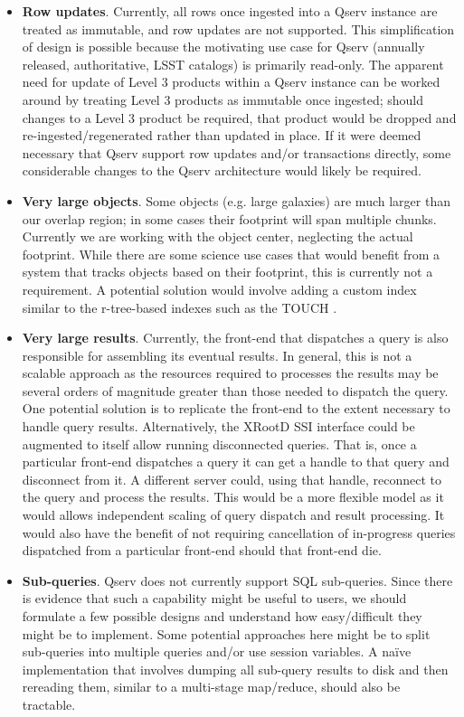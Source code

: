 \documentclass[DM,lsstdraft,toc]{lsstdoc}
\begin{document}
\begin{itemize}
\item
  \textbf{Row updates}. Currently, all rows once ingested into a Qserv
  instance are treated as immutable, and row updates are not supported. This
  simplification of design is possible because the motivating use case for
  Qserv (annually released, authoritative, LSST catalogs) is primarily
  read-only.  The apparent need for update of Level 3 products within a Qserv
  instance can be worked around by treating Level 3 products as immutable once
  ingested; should changes to a Level 3 product be required, that product
  would be dropped and re-ingested/regenerated rather than updated in place.
  If it were deemed necessary that Qserv support row updates and/or
  transactions directly, some considerable changes to the Qserv architecture
  would likely be required.
\item
  \textbf{Very large objects}. Some objects (e.g. large galaxies) are
  much larger than our overlap region; in some cases their footprint
  will span multiple chunks. Currently we are working with the object
  center, neglecting the actual footprint. While there are some science
  use cases that would benefit from a system that tracks objects based
  on their footprint, this is currently not a requirement. A potential
  solution would involve adding a custom index similar to the
  r-tree-based indexes such as the TOUCH
  \citep{Nobari:2013:TIS:2463676.2463700}.
\item
  \textbf{Very large results}. Currently, the front-end that dispatches
  a query is also responsible for assembling its eventual results. In general,
  this is not a scalable approach as the resources required to processes the
  results may be several orders of magnitude greater than those needed
  to dispatch the query.  One potential solution is to replicate the
  front-end to the extent necessary to handle query results. Alternatively,
  the XRootD SSI interface could be augmented to itself allow running
  disconnected queries. That is, once a particular front-end dispatches
  a query it can get a handle to that query and disconnect from it.
  A different server could, using that handle, reconnect to the query and
  process the results. This would be a more flexible model as it would allows
  independent scaling of query dispatch and result processing. It would also
  have the benefit of not requiring cancellation of in-progress queries
  dispatched from a particular front-end should that front-end die.
\item
  \textbf{Sub-queries}. Qserv does not currently support SQL sub-queries.
  Since there is evidence that such a capability might be useful to users, we
  should formulate a few possible designs and understand how easy/difficult
  they might be to implement.  Some potential approaches here might be to
  split sub-queries into multiple queries and/or use session variables. A
  naïve implementation that involves dumping all sub-query results to disk
  and then rereading them, similar to a multi-stage map/reduce, should also
  be tractable.
\end{itemize}
\end{document}
